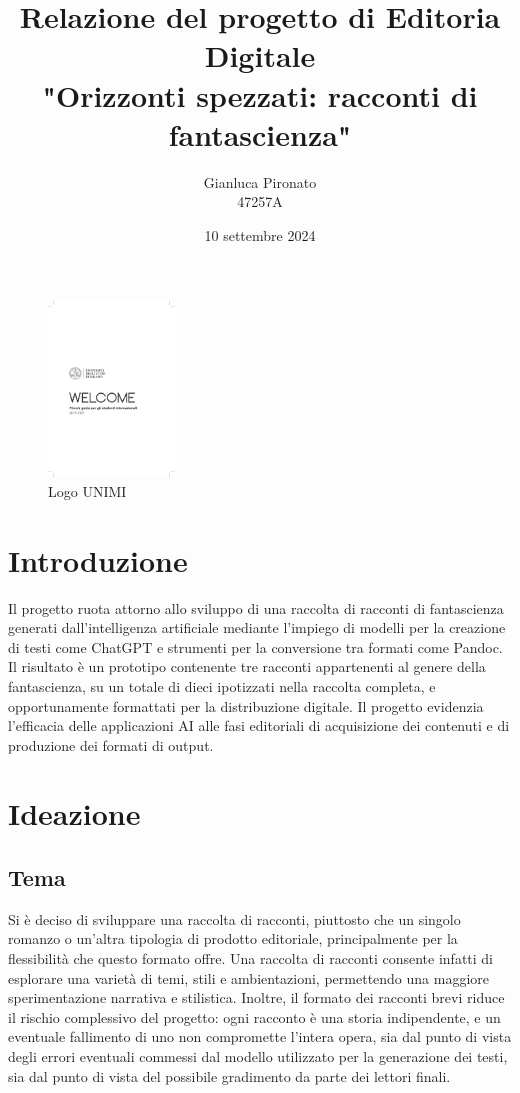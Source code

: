 \documentclass[a4paper,12pt]{article}
\title{Relazione del progetto di Editoria Digitale \\ "Orizzonti spezzati: racconti di fantascienza"}
\author{Gianluca Pironato \\ 47257A}
\date{10 settembre 2024}
\begin{document}
\clearpage\maketitle
\thispagestyle{empty}

\begin{figure}[h]
    \centering
    \includegraphics[width=0.3\textwidth]{unimi.pdf} %
    \caption{Logo UNIMI}
\end{figure}

\newpage

\setcounter{page}{1}

\section*{Introduzione}

Il progetto ruota attorno allo sviluppo di una raccolta di racconti di fantascienza generati dall'intelligenza artificiale mediante l'impiego di modelli per la creazione di testi come ChatGPT e strumenti per la conversione tra formati come Pandoc. Il risultato è un prototipo contenente tre racconti appartenenti al genere della fantascienza, su un totale di dieci ipotizzati nella raccolta completa, e opportunamente formattati per la distribuzione digitale. Il progetto evidenzia l'efficacia delle applicazioni AI alle fasi editoriali di acquisizione dei contenuti e di produzione dei formati di output.

\section*{Ideazione}
\subsection*{Tema}

Si è deciso di sviluppare una raccolta di racconti, piuttosto che un singolo romanzo o un'altra tipologia di prodotto editoriale, principalmente per la flessibilità che questo formato offre. Una raccolta di racconti consente infatti di esplorare una varietà di temi, stili e ambientazioni, permettendo una maggiore sperimentazione narrativa e stilistica. Inoltre, il formato dei racconti brevi riduce il rischio complessivo del progetto: ogni racconto è una storia indipendente, e un eventuale fallimento di uno non compromette l'intera opera, sia dal punto di vista degli errori eventuali commessi dal modello utilizzato per la generazione dei testi, sia dal punto di vista del possibile gradimento da parte dei lettori finali.
\end{document}
